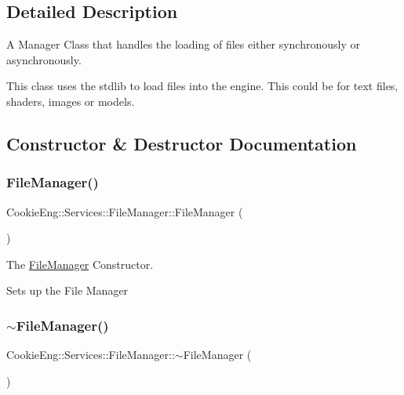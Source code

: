 \subsection{Detailed Description}
A Manager Class that handles the loading of files either synchronously or asynchronously. 

This class uses the stdlib to load files into the engine. This could be for text files, shaders, images or models. 

\subsection{Constructor \& Destructor Documentation}
\mbox{\label{class_cookie_eng_1_1_services_1_1_file_manager_a3ff15b868df81ba7d9964382f6474ef5}} 
\subsubsection{\texorpdfstring{File\+Manager()}{FileManager()}}
{\footnotesize\ttfamily Cookie\+Eng\+::\+Services\+::\+File\+Manager\+::\+File\+Manager (\begin{DoxyParamCaption}{ }\end{DoxyParamCaption})}



The \hyperlink{class_cookie_eng_1_1_services_1_1_file_manager}{File\+Manager} Constructor. 

Sets up the File Manager \mbox{\label{class_cookie_eng_1_1_services_1_1_file_manager_a51e133f4fd86a874129a63be191b91ba}} 
\subsubsection{\texorpdfstring{$\sim$\+File\+Manager()}{~FileManager()}}
{\footnotesize\ttfamily Cookie\+Eng\+::\+Services\+::\+File\+Manager\+::$\sim$\+File\+Manager (\begin{DoxyParamCaption}{ }\end{DoxyParamCaption})}



